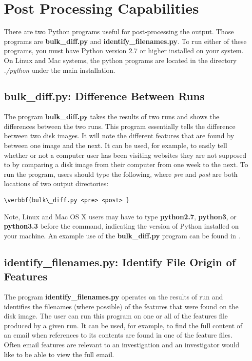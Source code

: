 \documentclass[11pt]{article} %
\begin{document}
\section{Post Processing Capabilities}
\label{PostProcessing}
There are two Python programs useful for post-processing the \bulk output. Those programs are \textbf{bulk\_diff.py} and \textbf{identify\_filenames.py}. To run either of these programs, you must have Python version 2.7 or higher installed on your system. On Linux and Mac systems, the \bulk python programs are located in the directory \textit{./python} under the main \bulk installation. \\

\subsection{bulk\_diff.py: Difference Between Runs}
The program \textbf{bulk\_diff.py} takes the results of two \bulk runs and shows the differences between the two runs. This program essentially tells the difference between two disk images. It will note the different features that are found by \bulk between one image and the next. It can be used, for example, to easily tell whether or not a computer user has been visiting websites they are not supposed to by comparing a disk image from their computer from one week to the next. To run the program, users should type the following, where \textit{pre} and \textit{post} are both locations of two \bulk output directories:
\begin{Verbatim}[commandchars=\\\{\}]
\verbbf{bulk\_diff.py <pre> <post> }
\end{Verbatim} 
Note, Linux and Mac OS X users may have to type \textbf{python2.7}, \textbf{python3}, or \textbf{python3.3} before the command, indicating the version of Python installed on your machine. An example use of the \textbf{bulk\_diff.py} program can be found in .


\subsection{identify\_filenames.py: Identify File Origin of Features}
The program \textbf{identify\_filenames.py} operates on the results of \bulk run and identifies the filenames (where possible) of the features that were found on the disk image. The user can run this program on one or all of the features file produced by a given run. It can be used, for example, to find the full content of an email when references to its contents are found in one of the feature files. Often email features are relevant to an investigation and an investigator would like to be able to view the full email.\\
\end{document}
